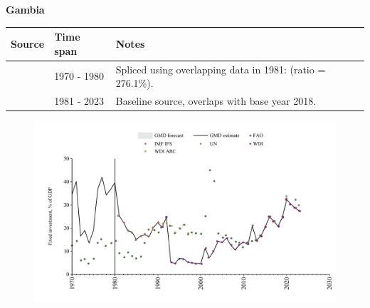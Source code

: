 \documentclass[12pt,a4paper,landscape]{article}
\begin{document}
\begin{adjustbox}{max totalsize={\paperwidth}{\paperheight},center}
\begin{minipage}[t][\textheight][t]{\textwidth}
\vspace*{0.5cm}
{}
\begin{center}
{\Large\bfseries Gambia}
\end{center}
\vspace{0.5cm}
\begin{table}[H]
\centering
\small
\begin{tabular}{|l|l|l|}
\hline
\textbf{Source} & \textbf{Time span} & \textbf{Notes} \\
\hline
\rowcolor{white}\cite{UN}& 1970 - 1980 &Spliced using overlapping data in 1981: (ratio = 276.1\%).\\
\rowcolor{lightgray}\cite{WDI}& 1981 - 2023 &Baseline source, overlaps with base year 2018.\\
\hline
\end{tabular}
\end{table}
\begin{figure}[H]
\centering
\includegraphics[width=\textwidth,height=0.6\textheight,keepaspectratio]{graphs/GMB_finv_GDP.pdf}
\end{figure}
\end{minipage}
\end{adjustbox}
\end{document}
